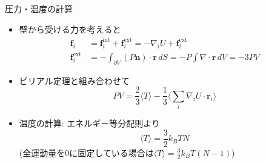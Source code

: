
\begin{frame}[t,fragile]{圧力・温度の計算}
  \begin{itemize}
  \item 壁から受ける力を考えると
    \begin{align*}
    \mathbf{f}_i &= \mathbf{f}_i^\text{int} + \mathbf{f}_i^\text{ext} = -\nabla_i U + \mathbf{f}_i^\text{ext} \\
      \mathbf{f}_i^\text{ext} &= - \int_{\partial V} (P \mathbf{n}) \cdot \mathbf{r} \, dS = - P \int \nabla \cdot \mathbf{r} \, dV = -3PV
    \end{align*}
  \item ビリアル定理と組み合わせて
    \[
    PV = \frac{2}{3} \langle T \rangle -\frac{1}{3} \langle \sum_i \nabla_i U \cdot \mathbf{r}_i \rangle
    \]
  \item 温度の計算: エネルギー等分配則より
    \[
    \langle T \rangle = \frac{3}{2} k_B T N
    \]
    (全運動量を0に固定している場合は$\langle T \rangle = \frac{3}{2} k_B T (N-1)$)
  \end{itemize}
\end{frame}

